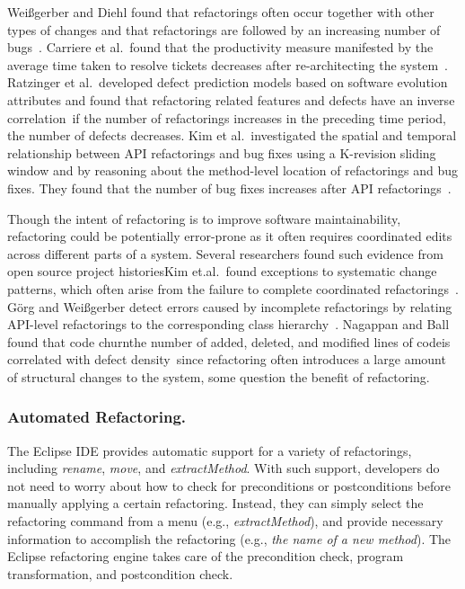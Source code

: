 Wei{\ss}gerber and Diehl found that refactorings often occur together with other types of changes and that refactorings are followed by an increasing number of bugs~\cite{Weissgerber2006:refactor}. Carriere et al.~found that the productivity measure manifested by the average time taken to resolve tickets decreases after re-architecting the system~\cite{Carriere2010:architecture}. Ratzinger et al.~developed defect prediction models based on software evolution attributes and found that refactoring related features and defects have an inverse correlation~\cite{Ratzinger2008:refactor}\textemdash if the number of refactorings increases in the preceding time period, the number of defects decreases. Kim et al.~investigated the spatial and temporal relationship between API refactorings and bug fixes using a K-revision sliding window and by reasoning about the method-level location of refactorings and bug fixes. They found that the number of bug fixes increases after API refactorings~\cite{Kim2011:refactorbug}.  

Though the intent of refactoring is to improve software maintainability, refactoring could be potentially error-prone as it often requires coordinated edits across different parts of a system. Several researchers found such evidence from open source project histories\textemdash Kim et.al.~found exceptions to systematic change patterns, which often arise from the failure to complete coordinated refactorings~\cite{Kim2007,Kim:2009}. G{\"o}rg and Wei{\ss}gerber detect errors caused by incomplete refactorings by relating API-level refactorings to the corresponding class hierarchy~\cite{Gorg2005a}. Nagappan and Ball found that code churn\textemdash the number of added, deleted, and modified lines of code\textemdash is correlated with defect density~\cite{Nagappan2005}\textemdash since refactoring often introduces a large amount of structural changes to the system, some question the benefit of refactoring. 

\subsubsection{Automated Refactoring.} 
\label{sec:automatedrefactoring} 

The Eclipse IDE provides automatic support for a variety of refactorings, including \emph{rename}, \emph{move}, and \emph{extractMethod}. With such support, developers do not need to worry about how to check for preconditions or postconditions before manually applying a certain refactoring. Instead, they can simply select the refactoring command from a menu (e.g., \emph{extractMethod}), and provide necessary information to accomplish the refactoring (e.g., \emph{the name of a new method}). The Eclipse refactoring engine takes care of the precondition check, program transformation, and postcondition check. 

